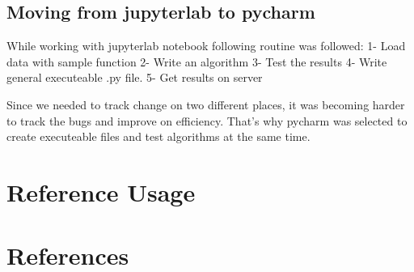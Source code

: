 \documentclass[12pt]{article}
\begin{document}
\subsection{Moving from jupyterlab to pycharm}
While working with jupyterlab notebook following routine was followed:
1- Load data with sample function
2- Write an algorithm
3- Test the results
4- Write general executeable .py file.
5- Get results on server

Since we needed to track change on two different places,
it was becoming harder to track the bugs and improve on efficiency.
That's why pycharm was selected to create executeable files and test
algorithms at the same time.
\section{Reference Usage}

\section{References}
\begingroup
\nocite{*}
\renewcommand{\section}[2]{}


\endgroup
\end{document}

